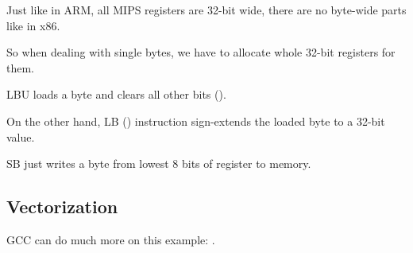 Just like in ARM, all MIPS registers are 32-bit wide, there are no byte-wide parts like in x86.

So when dealing with single bytes, we have to allocate whole 32-bit registers for them.

LBU loads a byte and clears all other bits ().

On the other hand, LB () instruction sign-extends the loaded byte to a 32-bit value.

SB just writes a byte from lowest 8 bits of register to memory.

\fi

\subsection{Vectorization}

\Optimizing GCC can do much more on this example: 
.
